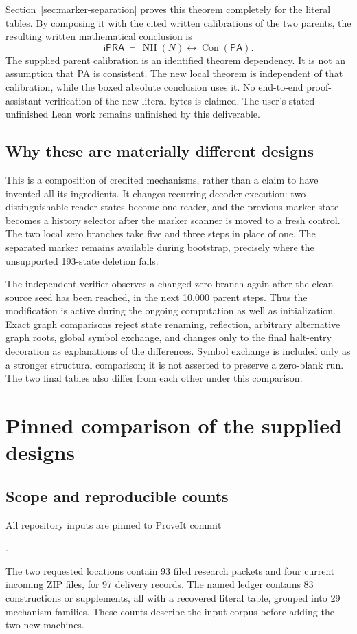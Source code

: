 \documentclass[11pt]{article}
\newcommand{\ipra}{\mathsf{iPRA}}
\newcommand{\pa}{\mathsf{PA}}
\newcommand{\NH}{\operatorname{NH}}
\newcommand{\Con}{\operatorname{Con}}
\newcommand{\digest}[1]{{\ttfamily\small\seqsplit{#1}}}
\begin{document}
Section~\ref{sec:marker-separation} proves this theorem completely for
the literal tables. By composing it with the cited written calibrations
of the two parents, the resulting written mathematical conclusion is
\[
 \boxed{\quad \ipra\ \vdash\ \NH(N)\longleftrightarrow\Con(\pa).
 \quad}
\]
The supplied parent calibration is an identified theorem dependency.
It is not an assumption that PA is consistent. The new local theorem is
independent of that calibration, while the boxed absolute conclusion uses
it. No end-to-end proof-assistant verification of the new literal bytes
is claimed. The user's stated unfinished Lean work remains unfinished
by this deliverable.

\subsection{Why these are materially different designs}
This is a composition of credited mechanisms, rather than a claim to
have invented all its ingredients. It changes recurring decoder
execution: two distinguishable reader states become one reader, and the
previous marker state becomes a history selector after the marker
scanner is moved to a fresh control. The two local zero branches take
five and three steps in place of one. The separated marker remains
available during bootstrap, precisely where the unsupported 193-state
deletion fails.

The independent verifier observes a changed zero branch again after the
clean source seed has been reached, in the next 10,000 parent steps.
Thus the modification is active during the ongoing computation as well
as initialization. Exact graph comparisons reject state renaming,
reflection, arbitrary alternative graph roots, global symbol exchange,
and changes only to the final halt-entry decoration as explanations of
the differences. Symbol exchange is included only as a stronger
structural comparison; it is not asserted to preserve a zero-blank run.
The two final tables also differ from each other under this comparison.

\section{Pinned comparison of the supplied designs}
\label{sec:comparison}

\subsection{Scope and reproducible counts}
All repository inputs are pinned to ProveIt commit
\begin{center}
\digest{793c68737d94bffa4e32a75bce6cc8058d6d22f0}.
\end{center}
The two requested locations contain 93 filed research packets and four
current incoming ZIP files, for 97 delivery records. The named ledger
contains 83 constructions or supplements, all with a recovered literal
table, grouped into 29 mechanism families. These counts describe the
input corpus before adding the two new machines.
\end{document}

